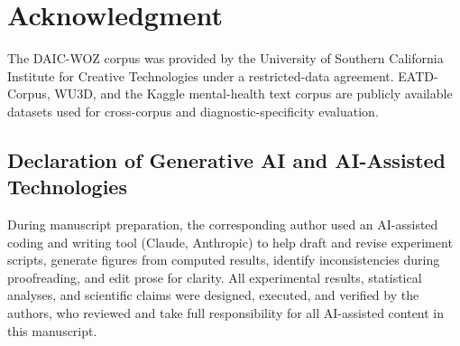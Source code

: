 \documentclass[5p,twocolumn]{elsarticle}
\begin{document}
\section*{Acknowledgment}
The DAIC-WOZ corpus was provided by the University of Southern
California Institute for Creative Technologies under a restricted-data
agreement. EATD-Corpus, WU3D, and the Kaggle mental-health text corpus
\cite{sarkar2022mentalhealth} are publicly available datasets used for
cross-corpus and diagnostic-specificity evaluation.

\subsection*{Declaration of Generative AI and AI-Assisted Technologies}
During manuscript preparation, the corresponding author used an
AI-assisted coding and writing tool (Claude, Anthropic) to help draft
and revise experiment scripts, generate figures from computed results,
identify inconsistencies during proofreading, and edit prose for
clarity. All experimental results, statistical analyses, and
scientific claims were designed, executed, and verified by the
authors, who reviewed and take full responsibility for all AI-assisted
content in this manuscript.
\end{document}
